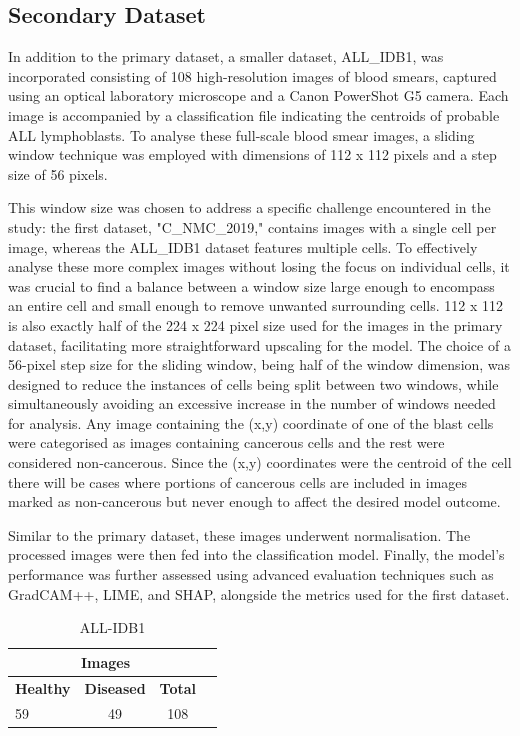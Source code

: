 \documentclass[
	a4paper,
	10pt,
	unnumberedsections,
	twoside,
]{research_article}
\begin{document}
\newpage
\subsection{Secondary Dataset}
In addition to the primary dataset, a smaller dataset, ALL\_IDB1, was incorporated consisting of 108 high-resolution images of blood smears, captured using an optical laboratory microscope and a Canon PowerShot G5 camera. Each image is accompanied by a classification file indicating the centroids of probable ALL lymphoblasts. To analyse these full-scale blood smear images, a sliding window technique was employed with dimensions of 112 x 112 pixels and a step size of 56 pixels.

This window size was chosen to address a specific challenge encountered in the study: the first dataset, "C\_NMC\_2019," contains images with a single cell per image, whereas the ALL\_IDB1 dataset features multiple cells. To effectively analyse these more complex images without losing the focus on individual cells, it was crucial to find a balance between a window size large enough to encompass an entire cell and small enough to remove unwanted surrounding cells. 112 x 112 is also exactly half of the 224 x 224 pixel size used for the images in the primary dataset, facilitating more straightforward upscaling for the model. The choice of a 56-pixel step size for the sliding window, being half of the window dimension, was designed to reduce the instances of cells being split between two windows, while simultaneously avoiding an excessive increase in the number of windows needed for analysis. Any image containing the (x,y) coordinate of one of the blast cells were categorised as images containing cancerous cells and the rest were considered non-cancerous. Since the (x,y) coordinates were the centroid of the cell there will be cases where portions of cancerous cells are included in images marked as non-cancerous but never enough to affect the desired model outcome.

Similar to the primary dataset, these images underwent normalisation. The processed images were then fed into the classification model. Finally, the model's performance was further assessed using advanced evaluation techniques such as GradCAM++, LIME, and SHAP, alongside the metrics used for the first dataset.

\newpage
\begin{table}[ht]
	\caption{ALL-IDB1}
	\centering
	\label{tab:datasets}
	\begin{tabular}{lccc}
		\multicolumn{3}{c}{Images} \\
		\hline
		\textbf{Healthy} & \textbf{Diseased} & \textbf{Total} \\
		\hline
		59 & 49 & 108 \\
		\hline
	\end{tabular}
\end{table}
\end{document}
